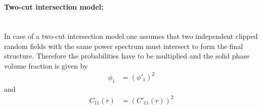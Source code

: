 \hspace{1pt} \\
\paragraph*{Two-cut intersection model:}\hspace{1pt} \\
In case of a two-cut intersection model one assumes that two independent clipped random fields with the same power spectrum must intersect to form the final structure. Therefore the probabilities have to be multiplied and the solid phase volume fraction is given by
\begin{align}\label{eq:Phi_1_twocutintersection}
  \phi_1 &=  \left(\phi'_1\right)^2
\end{align}
and
\begin{align}\label{eq:C11twocut}
  C_{11}(r) &=  \left(C'_{11}(r)\right)^2
\end{align}

